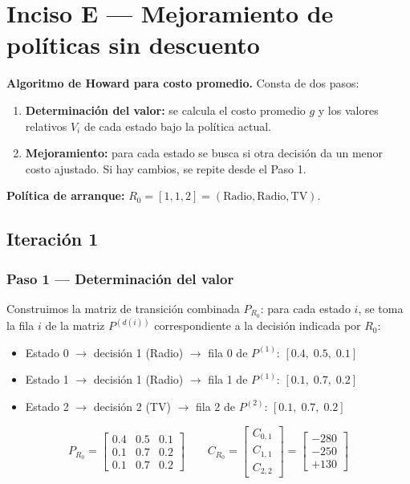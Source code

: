 \documentclass[12pt,a4paper]{article}
\begin{document}
\section{Inciso E --- Mejoramiento de políticas sin descuento}

\textbf{Algoritmo de Howard para costo promedio.} Consta de dos pasos:
\begin{enumerate}
    \item[\textbf{Paso 1.}] \textbf{Determinación del valor:} se calcula el costo promedio $g$ y los valores relativos $V_i$ de cada estado bajo la política actual.
    \item[\textbf{Paso 2.}] \textbf{Mejoramiento:} para cada estado se busca si otra decisión da un menor costo ajustado. Si hay cambios, se repite desde el Paso 1.
\end{enumerate}

\vspace{0.2cm}
\textbf{Política de arranque:} $R_0 = [1, 1, 2] = (\text{Radio}, \text{Radio}, \text{TV})$.

\subsection*{Iteración 1}

\subsubsection*{Paso 1 --- Determinación del valor}

Construimos la matriz de transición combinada $P_{R_0}$: para cada estado $i$, se toma la fila $i$ de la matriz $P^{(d(i))}$ correspondiente a la decisión indicada por $R_0$:
\begin{itemize}
    \item Estado 0 $\to$ decisión 1 (Radio) $\to$ fila 0 de $P^{(1)}$: $[0.4,\; 0.5,\; 0.1]$
    \item Estado 1 $\to$ decisión 1 (Radio) $\to$ fila 1 de $P^{(1)}$: $[0.1,\; 0.7,\; 0.2]$
    \item Estado 2 $\to$ decisión 2 (TV) $\to$ fila 2 de $P^{(2)}$: $[0.1,\; 0.7,\; 0.2]$
\end{itemize}

\[
P_{R_0} = \begin{bmatrix}
0.4 & 0.5 & 0.1 \\
0.1 & 0.7 & 0.2 \\
0.1 & 0.7 & 0.2
\end{bmatrix}
\qquad
C_{R_0} = \begin{bmatrix} C_{0,1} \\ C_{1,1} \\ C_{2,2} \end{bmatrix}
= \begin{bmatrix} -280 \\ -250 \\ +130 \end{bmatrix}
\]
\end{document}
